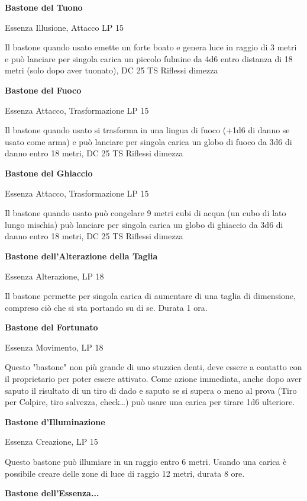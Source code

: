 \documentclass[a4paper,11pt,twoside,openany]{book}
\begin{document}
{\textbf{Bastone del Tuono}

Essenza Illusione, Attacco LP 15

Il bastone quando usato emette un forte boato e genera luce in raggio di 3 metri e può lanciare per singola carica un piccolo fulmine da 4d6 entro distanza di 18 metri (solo dopo aver tuonato), DC 25 TS Riflessi dimezza

\textbf{Bastone del Fuoco}

Essenza Attacco, Trasformazione LP 15

Il bastone quando usato si trasforma in una lingua di fuoco (+1d6 di danno se usato come arma) e può lanciare per singola carica un globo di fuoco da 3d6 di danno entro 18 metri, DC 25 TS Riflessi dimezza

\textbf{Bastone del Ghiaccio}

Essenza Attacco, Trasformazione LP 15

Il bastone quando usato può congelare 9 metri cubi di acqua (un cubo di lato lungo mischia) può lanciare per singola carica un globo di ghiaccio da 3d6 di danno entro 18 metri, DC 25 TS Riflessi dimezza 

\textbf{Bastone dell'Alterazione della Taglia}

Essenza Alterazione, LP 18

Il bastone permette per singola carica di aumentare di una taglia di dimensione, compreso ciò che si sta portando su di se. Durata 1 ora.

\textbf{Bastone del Fortunato}

Essenza Movimento, LP 18

Questo "bastone" non più grande di uno stuzzica denti, deve essere a contatto con il proprietario per poter essere attivato. Come azione immediata, anche dopo aver saputo il risultato di un tiro di dado e saputo se si supera o meno al prova (Tiro per Colpire, tiro salvezza, check\ldots ) può usare una carica per tirare 1d6 ulteriore.

\textbf{Bastone d'Illuminazione}

Essenza Creazione, LP 15

Questo bastone può illumiare in un raggio entro 6 metri. Usando una carica è possibile creare delle zone di luce di raggio 12 metri, durata 8 ore.

\textbf{Bastone dell'Essenza...}

}
\end{document}
